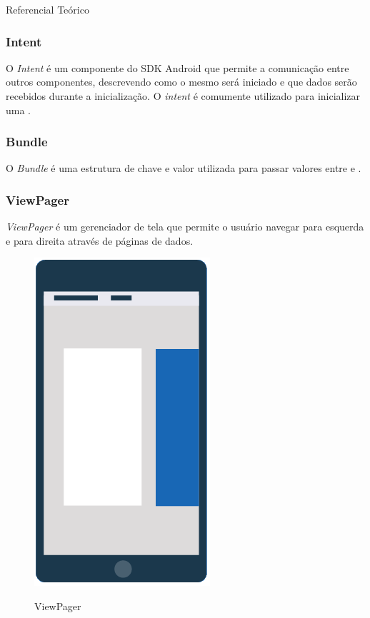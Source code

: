 \documentclass[
	12pt,				%
	openany,			%
	twoside,			%
	a4paper,			%
	english,			%
	french,				%
	spanish,			%
	brazil				%
	]{abntex2}
\begin{document}
\begin{chapter}{Referencial Teórico}
\subsubsection{Intent} \label{Intent}
O \textit{Intent} é um componente do SDK Android que permite a comunicação entre outros componentes, descrevendo como o mesmo será iniciado e que dados serão recebidos durante a inicialização. O \textit{intent} é comumente utilizado para inicializar uma .

\subsubsection{Bundle} \label{Bundle}
O \textit{Bundle} é uma estrutura de chave e valor utilizada para passar valores entre  e .


\newpage
\subsubsection{ViewPager} \label{ViewPager}
\textit{ViewPager} é um gerenciador de tela que permite o usuário navegar para esquerda e para direita através de páginas de dados.
\begin{figure}[h]
\centering
   \caption{ViewPager}
   \includegraphics[scale=0.8]{media/viewpager.jpg}
     \label{fig:viewpager}
\end{figure}


\end{chapter}
\end{document}
